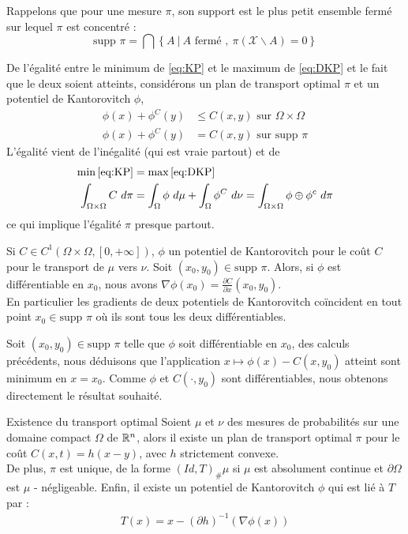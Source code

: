 \documentclass[a4paper,12pt]{article}
\newcommand{\supp}{\text{supp }}
\begin{document}
Rappelons que pour une mesure $\pi$, son support est le plus petit ensemble fermé sur lequel $\pi$ est concentré : 
$$
\supp \pi = \bigcap \left\{A\ |\ A \text{ fermé },\ \pi(\mathcal{X}\backslash A) = 0 \right\}
$$

De l'égalité entre le minimum de \eqref{eq:KP} et le maximum de \eqref{eq:DKP} et le fait que le deux soient atteints, considérons un plan de transport optimal $\pi$ et un potentiel de Kantorovitch $\phi$, 
\begin{align}
\phi(x)+\phi^C(y) &\leq C(x,y) \text{ sur } \Omega\times\Omega \\
\phi(x)+\phi^C(y) &= C(x,y) \text{ sur }\supp\pi
\end{align}
L'égalité vient de l'inégalité (qui est vraie partout) et de 
\begin{align}
\min\eqref{eq:KP} &= \max \eqref{eq:DKP}\nonumber\\
\int_{\Omega\times\Omega} C\ d\pi &= \int_{\Omega}\phi\ d\mu +  \int_{\Omega} \phi^C\ d\nu = \int_{\Omega\times\Omega} \phi\oplus\phi^c\ d\pi
\end{align}
ce qui implique l'égalité $\pi$ presque partout. 

\begin{proposition}
Si $C\in C^1(\Omega\times\Omega,[0,+\infty])$, $\phi$ un potentiel de Kantorovitch pour le coût $C$ pour le transport de $\mu$ vers $\nu$. Soit $(x_0,y_0)\in\supp\pi$. Alors, si $\phi$ est différentiable en $x_0$, nous avons $\nabla\phi(x_0)= \frac{\partial C}{\partial x}(x_0,y_0)$.\\
En particulier les gradients de deux potentiels de Kantorovitch coïncident en tout point $x_0\in\supp\pi$ où ils sont tous les deux différentiables.
\end{proposition}
\begin{preuve}
Soit $(x_0,y_0)\in\supp\pi$ telle que $\phi$ soit différentiable en $x_0$, des calculs précédents, nous déduisons que l'application $x\mapsto\phi(x)-C(x,y_0)$ atteint sont minimum en $x=x_0$. 
Comme $\phi$ et $C(\cdot,y_0)$ sont différentiables, nous obtenons directement le résultat souhaité. 
\end{preuve}


\begin{theoreme}{Existence du transport optimal}
\label{thm:existtrasp}
Soient $\mu$ et $\nu$ des mesures de probabilités sur une domaine compact $\Omega$ de $\mathbb{R}^n$, alors il existe un plan de transport optimal $\pi$ pour le coût $C(x,t) = h(x-y)$, avec $h$ strictement convexe. \\
De plus, $\pi$ est unique, de la forme $(Id,T)_{\#}\mu$ si $\mu$ est absolument continue et $\partial\Omega$ est $\mu$ - négligeable. Enfin, il existe un potentiel de Kantorovitch $\phi$ qui est lié à $T$ par :
\begin{align}
T(x) = x- (\partial h)^{-1}(\nabla\phi(x))
\end{align}
\end{theoreme}
\end{document}

